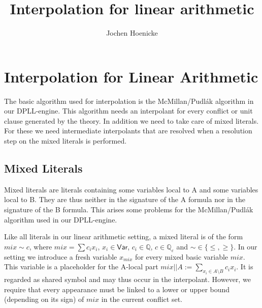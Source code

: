 \documentclass[a4paper]{article}
\title{Interpolation for linear arithmetic}
\author{Jochen Hoenicke}
\begin{document}
\maketitle

\let\eps\varepsilon
\def\rational{\mathbb{Q}}
\def\nat{\mathbb{N}}

\def\basic{basic}      %
\def\rrestrictA{||{A}} %
\def\restrictA{\setminus B}     %
\def\restrictB{|B}     %
\def\negc{\overline}
\def\lgeq{\lesseqgtr}
\def\insig{\prec}
\def\Var{\mathsf{Var}}
\def\implies{\Rightarrow}
\def\false{\mathsf{false}}
\def\round#1{[#1]}
\def\frac#1{\underline{#1}}

\section{Interpolation for Linear Arithmetic}

The basic algorithm used for interpolation is the McMillan/Pudl\'ak
algorithm in our DPLL-engine.  This algorithm needs an interpolant for
every conflict or unit clause generated by the theory.  In addition we
need to take care of mixed literals.  For these we need intermediate
interpolants that are resolved when a resolution step on the mixed
literals is performed.

\subsection{Mixed Literals}

Mixed literals are literals containing some variables local to A and some
variables local to B.  They are thus neither in the signature of the A formula
nor in the signature of the B formula.  This arises some problems for
the McMillan/Pudl\'ak algorithm used in our DPLL-engine.

Like all literals in our linear arithmetic setting, a mixed literal is of the
form $mix \sim c$, where $mix = \sum c_i x_i$, $x_i\in\Var$,
$c_i\in\rational$, $c \in \rational_{\eps}$ and $\sim\in\{\leq,\geq\}$.  In
our setting we introduce a fresh variable $x_{mix}$ for every mixed \basic
variable $mix$.  This variable is a placeholder for the A-local part 
$mix\rrestrictA := \sum_{x_i\in A \setminus B} c_i x_i$.  It is
regarded as shared symbol and may thus occur in the interpolant.  However, we
require that every appearance must be linked to a lower or upper bound
(depending on its sign) of $mix$ in the current conflict set.
\end{document}
